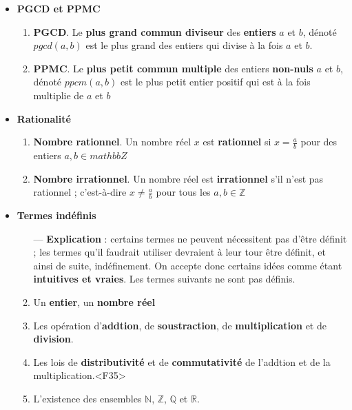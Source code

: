 \documentclass[16pt]{report}
\begin{document}
\begin{multicols*}{2}
\begin{itemize}
                \item \textcolor{myp}{\textbf{PGCD et PPMC}} 
                    \begin{enumerate}
                        \item \textbf{\textcolor{myb}{PGCD}}.  Le \textbf{\textcolor{myb}{plus grand commun diviseur}} 
                            des \textbf{entiers} $a$ et $b$, dénoté $pgcd(a,b)$ est le plus grand des entiers 
                            qui divise à la fois $a$ et $b$. 
                        \item \textbf{\textcolor{myb}{PPMC}}. Le \textbf{\textcolor{myb}{plus petit commun multiple}} 
                            des entiers \textbf{non-nuls} $a$ et $b$, dénoté $ppcm(a,b)$ est le plus petit 
                            entier positif qui est à la fois multiplie de $a$ et $b$ 
                    \end{enumerate}
                \item \textcolor{myp}{\textbf{Rationalité}}                                                 
                    \begin{enumerate}
                        \item \textbf{\textcolor{myb}{Nombre rationnel}}.  Un nombre réel  $x$ est 
                            \textbf{\textcolor{myb}{rationnel}} si $x = \frac{a}{b}$ pour des entiers 
                            $a, b \in mathbb{Z}$ 
                        \item  \textbf{\textcolor{myb}{Nombre irrationnel}}. Un nombre réel est 
                            \textcolor{myb}{\textbf{irrationnel}} s'il n'est pas rationnel ; c'est-à-dire 
                            $x \neq \frac{a}{b}$ pour tous les $a, b \in \mathbb{Z}$  
                    \end{enumerate}
                \item \textcolor{myb}{\textbf{Termes indéfinis}} 
                    \begin{enumerate}
                        \item[—]  \textbf{Explication} : certains termes ne peuvent nécessitent pas d'être définit ; 
                            les termes qu'il faudrait utiliser devraient à leur tour être définit, et ainsi de suite, 
                            indéfinement. On accepte donc certains idées comme étant \textbf{intuitives et vraies}. 
                            Les termes suivants ne sont pas définis. 
                        \item Un \textbf{entier}, un \textbf{nombre réel} 
                        \item Les opération d'\textbf{addtion}, de \textbf{soustraction}, de \textbf{multiplication} 
                            et de \textbf{division}.  
                        \item Les lois de \textbf{distributivité} et de \textbf{commutativité} de l'addtion et de la 
                            multiplication.<F35>
                        \item L'existence des ensembles $\mathbb{N}$, $\mathbb{Z}$, $\mathbb{Q}$ et $\mathbb{R}$.


\end{enumerate}
\end{itemize}
\end{multicols*}
\end{document}
